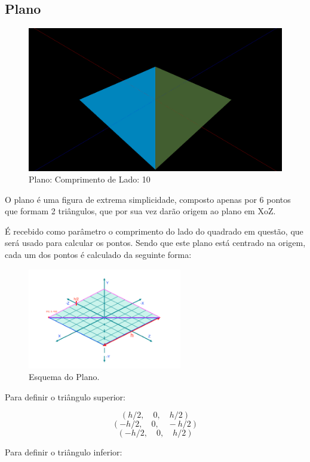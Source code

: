 \documentclass[a4paper]{article}
\begin{document}
\subsection{Plano}
\begin{figure}[H]
    \centering
    \includegraphics[width=\textwidth]{plane.png}
    \caption{Plano: Comprimento de Lado: 10}
\end{figure}

O plano é uma figura de extrema simplicidade, composto apenas por 6 pontos que formam 2 triângulos, que por sua vez darão origem ao plano em XoZ.


É recebido como parâmetro o comprimento do lado do quadrado em questão, que será usado para calcular os pontos. Sendo que este plano está centrado na origem, cada um dos pontos é calculado da seguinte forma:

\begin{figure}[H]
    \centering
    \includegraphics[width=0.6\textwidth]{esquemaPlano.PNG}
    \caption{Esquema do Plano.}
\end{figure}

Para definir o triângulo superior:

\[(h/2,\quad 0, \quad h/2)\]
\[(-h/2,\quad  0, \quad -h/2)\]
\[(-h/2,\quad  0, \quad h/2)\]

Para definir o triângulo inferior:
\end{document}
